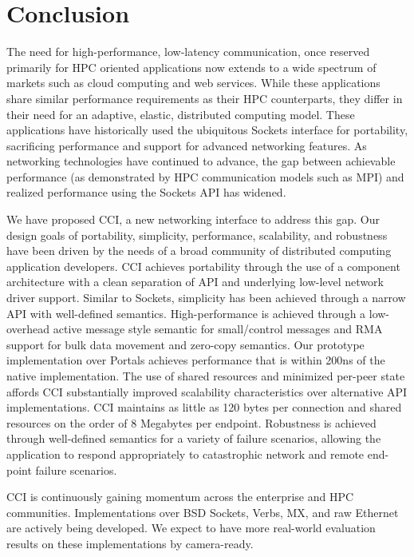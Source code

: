 \section{Conclusion}
\label{sec:conclusion}

The need for high-performance, low-latency communication, once
reserved primarily for HPC oriented applications now extends to a wide
spectrum of markets such as cloud computing and web services. 
While these applications share similar
performance requirements as their HPC counterparts, they differ in
their need for an adaptive, elastic, distributed computing
model. These applications have historically used the ubiquitous
Sockets interface for portability, sacrificing performance and support for advanced
networking features. As networking technologies have
continued to advance, the gap between achievable performance (as
demonstrated by HPC communication models such as MPI) and realized
performance using the Sockets API has widened. 

We have proposed CCI, a new networking interface to address this gap. 
Our design goals of portability, simplicity, performance, scalability,
and robustness have been driven by the needs of a broad community of
distributed computing application developers. CCI achieves portability
through the use of a component architecture with a clean separation of
API and underlying low-level network driver support. Similar to
Sockets, simplicity has been achieved through a narrow API with
well-defined semantics. High-performance is achieved through a
low-overhead active message style semantic for small/control messages
and RMA support for bulk data movement and zero-copy
semantics. Our prototype implementation over Portals achieves performance that is
within 200ns of the native implementation. The use of shared
resources and minimized per-peer state affords CCI substantially
improved scalability characteristics over alternative API
implementations. CCI maintains as little as 120 bytes per connection
and shared resources on the order of 8 Megabytes per endpoint. Robustness is
achieved through well-defined semantics for a variety of failure
scenarios, allowing the application to respond appropriately to
catastrophic network and remote end-point failure scenarios.  

CCI is continuously gaining momentum across the enterprise and HPC communities.
Implementations over BSD Sockets, Verbs, MX, and raw Ethernet are actively 
being developed. We expect to have more real-world evaluation results on these implementations 
by camera-ready. 


